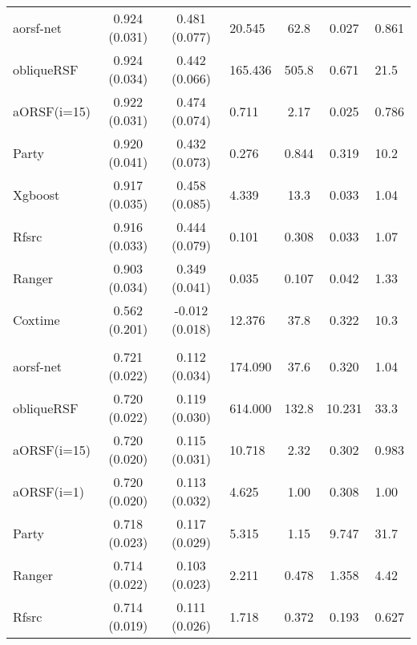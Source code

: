 \documentclass[twoside,11pt]{article}\usepackage[]{graphicx}\usepackage[]{color}
\newenvironment{knitrout}{}{} %
\begin{document}
\begin{knitrout}
\begin{longtable}{lcclccl}
\hspace{1em}aorsf-net & 0.924 (0.031) & 0.481 (0.077) & 20.545 & 62.8 & 0.027 & 0.861\\
\hspace{1em}obliqueRSF & 0.924 (0.034) & 0.442 (0.066) & 165.436 & 505.8 & 0.671 & 21.5\\
\hspace{1em}aORSF(i=15) & 0.922 (0.031) & 0.474 (0.074) & 0.711 & 2.17 & 0.025 & 0.786\\
\hspace{1em}Party & 0.920 (0.041) & 0.432 (0.073) & 0.276 & 0.844 & 0.319 & 10.2\\
\hspace{1em}Xgboost & 0.917 (0.035) & 0.458 (0.085) & 4.339 & 13.3 & 0.033 & 1.04\\
\hspace{1em}Rfsrc & 0.916 (0.033) & 0.444 (0.079) & 0.101 & 0.308 & 0.033 & 1.07\\
\hspace{1em}Ranger & 0.903 (0.034) & 0.349 (0.041) & 0.035 & 0.107 & 0.042 & 1.33\\
\hspace{1em}Coxtime & 0.562 (0.201) & -0.012 (0.018) & 12.376 & 37.8 & 0.322 & 10.3\\
\addlinespace[0.3em]
\hline
\multicolumn{7}{l}{\textit{\textbf{peakV02}}}\\
\hline
\hspace{1em}aorsf-net & 0.721 (0.022) & 0.112 (0.034) & 174.090 & 37.6 & 0.320 & 1.04\\
\hspace{1em}obliqueRSF & 0.720 (0.022) & 0.119 (0.030) & 614.000 & 132.8 & 10.231 & 33.3\\
\hspace{1em}aORSF(i=15) & 0.720 (0.020) & 0.115 (0.031) & 10.718 & 2.32 & 0.302 & 0.983\\
\hspace{1em}aORSF(i=1) & 0.720 (0.020) & 0.113 (0.032) & 4.625 & 1.00 & 0.308 & 1.00\\
\hspace{1em}Party & 0.718 (0.023) & 0.117 (0.029) & 5.315 & 1.15 & 9.747 & 31.7\\
\hspace{1em}Ranger & 0.714 (0.022) & 0.103 (0.023) & 2.211 & 0.478 & 1.358 & 4.42\\
\hspace{1em}Rfsrc & 0.714 (0.019) & 0.111 (0.026) & 1.718 & 0.372 & 0.193 & 0.627\\

\end{longtable}
\end{knitrout}
\end{document}
